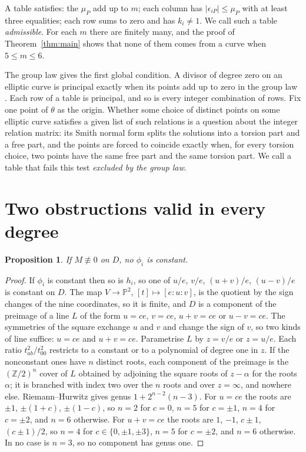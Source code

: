 \documentclass[11pt]{amsart}
\newtheorem{proposition}[theorem]{Proposition}
\theoremstyle{definition}
\newcommand{\PP}{\mathbb{P}}
\begin{document}
A table satisfies: the $\mu_P$ add up to $m$; each column has $|\epsilon_{iP}|\le\mu_P$ with at least three equalities;
each row sums to zero and has $k_i\ne1$. We call such a table \emph{admissible}. For each $m$ there are finitely many,
and the proof of Theorem~\ref{thm:main} shows that none of them comes from a curve when $5\le m\le 6$.

The group law gives the first global condition. A divisor of degree zero on an elliptic curve is principal exactly
when its points add up to zero in the group law \cite[Cor.~III.3.5]{Si}. Each row of a table is principal, and so is
every integer combination of rows. Fix one point of $\theta$ as the origin. Whether some choice of distinct points on
some elliptic curve satisfies a given list of such relations is a question about the integer relation matrix: its
Smith normal form splits the solutions into a torsion part and a free part, and the points are forced to coincide
exactly when, for every torsion choice, two points have the same free part and the same torsion part. We call a table
that fails this test \emph{excluded by the group law}.

\section{Two obstructions valid in every degree}\label{sec:distinct}

\begin{proposition}\label{prop:nonconst}
If $M\not\equiv0$ on $D$, no $\phi_i$ is constant.
\end{proposition}

\begin{proof}
If $\phi_i$ is constant then so is $h_i$, so one of $u/e$, $v/e$, $(u+v)/e$, $(u-v)/e$ is constant on $D$. The map
$V\to\PP^2$, $[t]\mapsto[e:u:v]$, is the quotient by the sign changes of the nine coordinates, so it is finite, and
$D$ is a component of the preimage of a line $L$ of the form $u=ce$, $v=ce$, $u+v=ce$ or $u-v=ce$. The symmetries of
the square exchange $u$ and $v$ and change the sign of $v$, so two kinds of line suffice: $u=ce$ and $u+v=ce$.
Parametrise $L$ by $z=v/e$ or $z=u/e$. Each ratio $t_{ab}^2/t_{00}^2$ restricts to a constant or to a polynomial of
degree one in $z$. If the nonconstant ones have $n$ distinct roots, each component of the preimage is the
$(\mathbb Z/2)^n$ cover of $L$ obtained by adjoining the square roots of $z-\alpha$ for the roots $\alpha$; it is
branched with index two over the $n$ roots and over $z=\infty$, and nowhere else. Riemann--Hurwitz gives genus
$1+2^{n-2}(n-3)$. For $u=ce$ the roots are $\pm1$, $\pm(1+c)$, $\pm(1-c)$, so $n=2$ for $c=0$, $n=5$ for $c=\pm1$,
$n=4$ for $c=\pm2$, and $n=6$ otherwise. For $u+v=ce$ the roots are $1$, $-1$, $c\pm1$, $(c\pm1)/2$, so $n=4$ for
$c\in\{0,\pm1,\pm3\}$, $n=5$ for $c=\pm2$, and $n=6$ otherwise. In no case is $n=3$, so no component has genus one.
\end{proof}
\end{document}
